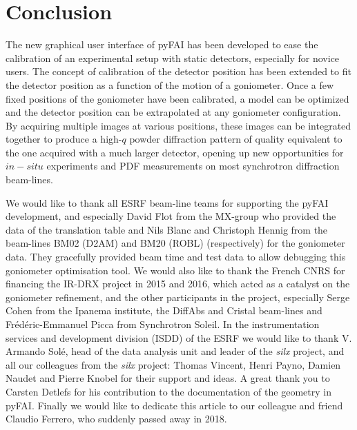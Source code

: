 \documentclass[preprint]{iucr}              %
\begin{document}
\section{Conclusion}

The new graphical user interface of pyFAI has been developed to ease the
calibration of an experimental setup with static detectors, especially for
novice users.
The concept of calibration of the detector position has been extended to fit
the detector position as a function of the motion of a goniometer.   
Once a few fixed positions of the goniometer have been calibrated, a model can
be optimized and the detector position can be extrapolated at any goniometer
configuration.
By acquiring multiple images at various positions, these images can be
integrated together to produce a high-$q$ powder diffraction pattern of
quality equivalent to the one acquired with a much larger detector, opening 
up new opportunities for $in-situ$ experiments and PDF measurements on most 
synchrotron diffraction beam-lines. 

 

We would like to thank all ESRF beam-line teams for supporting the
pyFAI development, and especially David Flot from the MX-group who provided the
data of the translation table and Nils Blanc and Christoph Hennig from the
beam-lines BM02 (D2AM) and BM20 (ROBL) (respectively) for the goniometer data. 
They gracefully provided beam time and test data to allow debugging this 
goniometer optimisation tool.
We would also like to thank the French CNRS for financing the IR-DRX project
in 2015 and 2016, which acted as a catalyst on the goniometer refinement,
and the other participants in the project, especially Serge Cohen from the
Ipanema institute, the DiffAbs and Cristal beam-lines and Frédéric-Emmanuel Picca 
from Synchrotron Soleil.
In the instrumentation services and development division (ISDD) of the ESRF  we
would like to thank V. Armando Solé, head of the data analysis unit and leader of 
the \textit{silx} project, and all our colleagues from the \textit{silx}
project:
Thomas Vincent, Henri Payno, Damien Naudet and  Pierre Knobel for their support and ideas. 
A great thank you to Carsten Detlefs for his contribution to the documentation of the geometry in pyFAI. 
Finally we would like to dedicate this article to our colleague and friend Claudio Ferrero, who suddenly passed away in 2018. 



\end{document}
